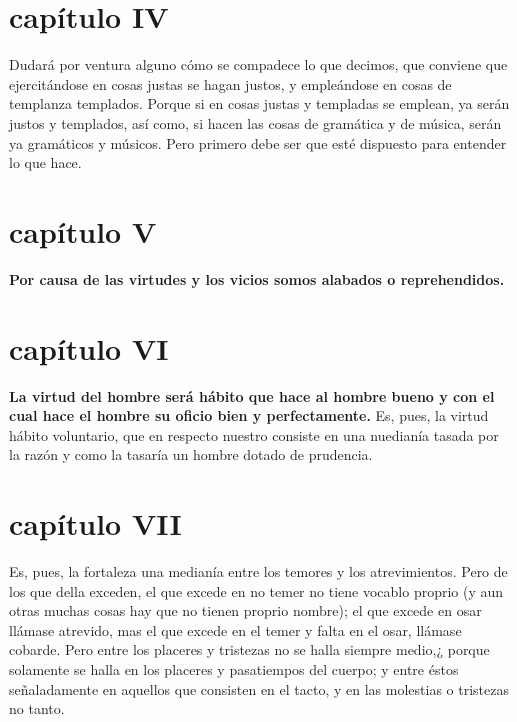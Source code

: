 \begin{multicols}{2}
\section*{capítulo IV}
Dudará por ventura alguno cómo se compadece lo que decimos, que conviene que ejercitándose en cosas justas se hagan justos, y empleándose en cosas de templanza templados. Porque si en cosas justas y
templadas se emplean, ya serán justos y templados, así como, si hacen las cosas de gramática y de música, serán ya gramáticos y músicos. Pero primero debe ser que esté dispuesto para entender lo que hace.\\

\section*{capítulo V}
\textbf{Por causa de las virtudes y los vicios somos alabados o reprehendidos.}\\

\section*{capítulo VI}
\textbf{La virtud del hombre será hábito que hace al hombre bueno y con el cual hace el hombre su oficio bien y perfectamente.} 
Es, pues, la virtud hábito voluntario, que en respecto nuestro consiste en una nuedianía tasada por la razón y como la tasaría un hombre dotado de prudencia.

\section*{capítulo VII}
Es, pues, la fortaleza una medianía entre los temores y los atrevimientos. Pero de los que della exceden, el que excede en no temer no tiene vocablo proprio (y aun otras muchas cosas hay que no tienen proprio nombre); el que excede en osar llámase atrevido, mas el que excede en el temer y falta en el osar, llámase cobarde. Pero entre los placeres y tristezas no se halla siempre medio,¿ porque solamente se halla en los placeres y pasatiempos del cuerpo; y entre éstos señaladamente en aquellos que consisten en el tacto, y en las molestias o tristezas no tanto. 

\end{multicols}

